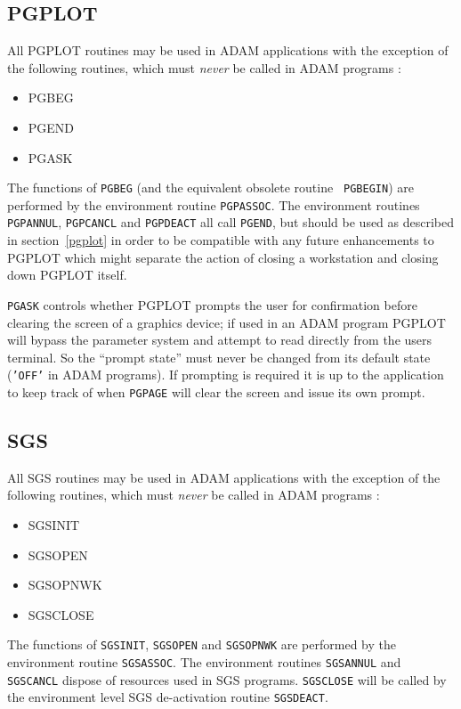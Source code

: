 \documentclass[twoside,11pt]{article}
\newcommand{\hyperref}[4]{#2\ref{#4}#3}
\newcommand{\htmlref}[2]{#1}
\newcommand{\xref}[3]{#1}
\renewcommand{\_}{\texttt{\symbol{95}}}
\begin{document}
\subsection{PGPLOT}

All PGPLOT routines may be used in ADAM applications with the exception of the
following routines, which must {\em never} be called in ADAM programs :
\begin{itemize}
\item \xref{PGBEG}{sun15}{PGBEG}
\item \xref{PGEND}{sun15}{PGEND}
\item \xref{PGASK}{sun15}{PGASK}
\end{itemize}
The functions of {\tt PGBEG} (and the equivalent obsolete routine {\tt
PGBEGIN}) are performed by the environment routine
\htmlref{{\tt PGP\_ASSOC}}{PGP_ASSOC}. The
environment routines \htmlref{{\tt PGP\_ANNUL}}{PGP_ANNUL},
\htmlref{{\tt PGP\_CANCL}}{PGP_CANCL} and
\htmlref{{\tt PGP\_DEACT}}{PGP_DEACT} all call {\tt PGEND},
but should be used as
described \hyperref{here}{in section~}{}{pgplot} in order to be compatible
with any future
enhancements to PGPLOT which might separate the action of closing a
workstation and closing down PGPLOT itself.

{\tt PGASK} controls whether PGPLOT prompts the user for confirmation before
clearing
the screen of a graphics device; if used in an ADAM program PGPLOT will bypass
the parameter system and attempt to read directly from the users terminal. So
the ``prompt state'' must never be changed from its
default state ({\tt{'OFF'}} in
ADAM programs). If prompting is required it is up to the application to keep
track of when
\xref{{\tt PGPAGE}}{sun15}{PGPAGE}
will clear the screen and issue its own prompt.

\subsection{SGS}

All SGS routines may be used in ADAM applications with the exception of the
following routines, which must {\em never} be called in ADAM programs :
\begin{itemize}
\item \xref{SGS\_INIT}{sun85}{SGS_INIT}
\item \xref{SGS\_OPEN}{sun85}{SGS_OPEN}
\item \xref{SGS\_OPNWK}{sun85}{SGS_OPNWK}
\item \xref{SGS\_CLOSE}{sun85}{SGS_CLOSE}
\end{itemize}
The functions of {\tt SGS\_INIT}, {\tt SGS\_OPEN} and {\tt SGS\_OPNWK} are
performed by the environment routine \htmlref{{\tt SGS\_ASSOC}}{SGS_ASSOC}.
The environment routines \htmlref{{\tt SGS\_ANNUL}}{SGS_ANNUL}
and \htmlref{{\tt SGS\_CANCL}}{SGS_CANCL} dispose of
resources used in SGS programs.  {\tt SGS\_CLOSE} will be called by the
environment level SGS de-activation routine
\htmlref{{\tt SGS\_DEACT}}{SGS_DEACT}.
\end{document}
